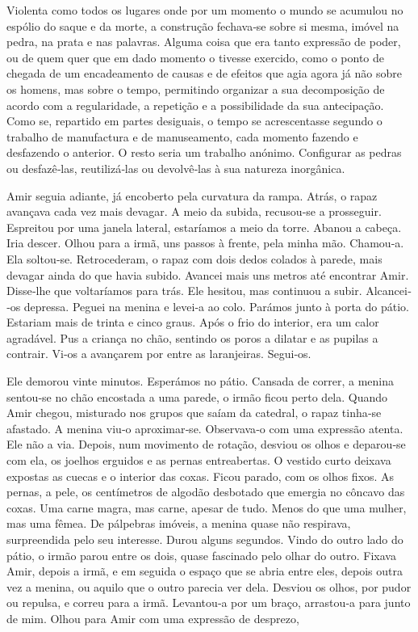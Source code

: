 Violenta como todos os lugares onde por um momento o mundo se acumulou
no espólio do saque e da morte, a construção fechava­‑se sobre si mesma,
imóvel na pedra, na prata e nas palavras. Alguma coisa que era tanto
expressão de poder, ou de quem quer que em dado momento o tivesse
exercido, como o ponto de chegada de um encadeamento de causas e de
efeitos que agia agora já não sobre os homens, mas sobre o tempo,
permitindo organizar a sua decomposição de acordo com a regularidade, a
repetição e a possibilidade da sua antecipação. Como se, repartido em
partes desiguais, o tempo se acrescentasse segundo o trabalho de
manufactura e de manuseamento, cada momento fazendo e desfazendo o
anterior. O resto seria um trabalho anónimo. Configurar as pedras ou
desfazê­‑las, reutilizá­‑las ou devolvê­‑las à sua natureza inorgânica.

Amir seguia adiante, já encoberto pela curvatura da rampa. Atrás, o
rapaz avançava cada vez mais devagar. A meio da subida, recusou­‑se a
prosseguir. Espreitou por uma janela lateral, estaríamos a meio da
torre. Abanou a cabeça. Iria descer. Olhou para a irmã, uns passos à
frente, pela minha mão. Chamou­‑a. Ela soltou­‑se. Retrocederam, o rapaz
com dois dedos colados à parede, mais devagar ainda do que havia subido.
Avancei mais uns metros até encontrar Amir. Disse­‑lhe que voltaríamos
para trás. Ele hesitou, mas continuou a subir. Alcancei­‑os depressa.
Peguei na menina e levei­‑a ao colo. Parámos junto à porta do pátio.
Estariam mais de trinta e cinco graus. Após o frio do interior, era um
calor agradável. Pus a criança no chão, sentindo os poros a dilatar e as
pupilas a contrair. Vi­‑os a avançarem por entre as laranjeiras.
Segui­‑os.

Ele demorou vinte minutos. Esperámos no pátio. Cansada de correr, a
menina sentou­‑se no chão encostada a uma parede, o irmão ficou perto
dela. Quando Amir chegou, misturado nos grupos que saíam da catedral, o
rapaz tinha­‑se afastado. A menina viu­‑o aproxi­mar­‑se. Observava­‑o
com uma expressão atenta. Ele não a via. Depois, num movimento de
rotação, desviou os olhos e deparou­‑se com ela, os joelhos erguidos e
as pernas entreabertas. O vestido curto deixava expostas as cuecas e o
interior das coxas. Ficou parado, com os olhos fixos. As pernas, a pele,
os centímetros de algodão desbotado que emergia no côncavo das coxas.
Uma carne magra, mas carne, apesar de tudo. Menos do que uma mulher, mas
uma fêmea. De pálpebras imóveis, a menina quase não respirava,
surpreendida pelo seu interesse. Durou alguns segundos. Vindo do outro
lado do pátio, o irmão parou entre os dois, quase fascinado pelo olhar
do outro. Fixava Amir, depois a irmã, e em seguida o espaço que se abria
entre eles, depois outra vez a menina, ou aquilo que o outro parecia ver
dela. Desviou os olhos, por pudor ou repulsa, e correu para a irmã.
Levantou­‑a por um braço, arrastou­‑a para junto de mim. Olhou para Amir
com uma expressão de desprezo,


